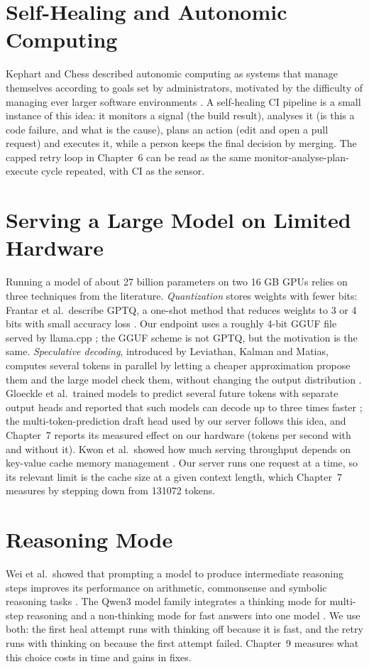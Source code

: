 \section{Self-Healing and Autonomic Computing}
Kephart and Chess described autonomic computing as systems that manage themselves according to goals set by administrators, motivated by the difficulty of managing ever larger software environments \cite{kephart03}. A self-healing CI pipeline is a small instance of this idea: it monitors a signal (the build result), analyses it (is this a code failure, and what is the cause), plans an action (edit and open a pull request) and executes it, while a person keeps the final decision by merging. The capped retry loop in Chapter~6 can be read as the same monitor-analyse-plan-execute cycle repeated, with CI as the sensor.

\section{Serving a Large Model on Limited Hardware}
Running a model of about 27 billion parameters on two 16 GB GPUs relies on three techniques from the literature. \emph{Quantization} stores weights with fewer bits: Frantar et al.\ describe GPTQ, a one-shot method that reduces weights to 3 or 4 bits with small accuracy loss \cite{frantar22}. Our endpoint uses a roughly 4-bit GGUF file served by llama.cpp \cite{llamacpp}; the GGUF scheme is not GPTQ, but the motivation is the same. \emph{Speculative decoding}, introduced by Leviathan, Kalman and Matias, computes several tokens in parallel by letting a cheaper approximation propose them and the large model check them, without changing the output distribution \cite{leviathan23}. Gloeckle et al.\ trained models to predict several future tokens with separate output heads and reported that such models can decode up to three times faster \cite{gloeckle24}; the multi-token-prediction draft head used by our server follows this idea, and Chapter~7 reports its measured effect on our hardware (tokens per second with and without it). Kwon et al.\ showed how much serving throughput depends on key-value cache memory management \cite{kwon23}. Our server runs one request at a time, so its relevant limit is the cache size at a given context length, which Chapter~7 measures by stepping down from 131072 tokens.

\section{Reasoning Mode}
Wei et al.\ showed that prompting a model to produce intermediate reasoning steps improves its performance on arithmetic, commonsense and symbolic reasoning tasks \cite{wei22}. The Qwen3 model family integrates a thinking mode for multi-step reasoning and a non-thinking mode for fast answers into one model \cite{qwen3}. We use both: the first heal attempt runs with thinking off because it is fast, and the retry runs with thinking on because the first attempt failed. Chapter~9 measures what this choice costs in time and gains in fixes.


